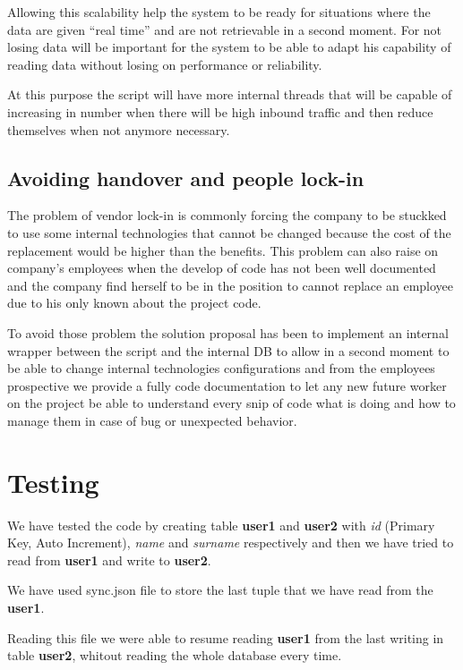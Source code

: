 Allowing this scalability help the system to be ready for situations where the data are given “real time” and are not retrievable in a second moment. For not losing data will be important for the system to be able to adapt his capability of reading data without losing on performance or reliability.

At this purpose the script will have more internal threads that will be capable of increasing in number when there will be high inbound traffic and then reduce themselves when not anymore necessary.

\subsection{Avoiding handover and people lock-in}

The problem of vendor lock-in is commonly forcing the company to be stuckked to use some internal technologies that cannot be changed because the cost of the replacement would be higher than the benefits. This problem can also raise on company’s employees when the develop of code has not been well documented and the company find herself to be in the position to cannot replace an employee due to his only known about the project code.

To avoid those problem the solution proposal has been to implement an internal wrapper between the script and the internal DB to allow in a second moment to be able to change internal technologies configurations and from the employees prospective we provide a fully code documentation to let any new future worker on the project be able to understand every snip of code what is doing and how to manage them in case of bug or unexpected behavior.

\section{Testing}

We have tested the code by creating table \textbf{user1} and \textbf{user2} with \textit{id} (Primary Key, Auto Increment), \textit{name} and \textit{surname} respectively and then we have tried to read from \textbf{user1} and write to \textbf{user2}.

We have used sync.json file to store the last tuple that we have read from the \textbf{user1}.

Reading this file we were able to resume reading \textbf{user1} from the last writing in table \textbf{user2}, whitout reading the whole database every time.

